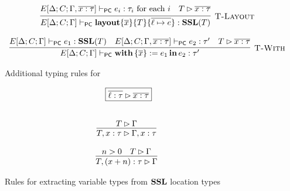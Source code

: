 \begin{figure}
  \[
    \begin{array}{c}
      \labinfer[T-Layout]{E[\Delta;C;\Gamma] \vdashpc \sslmath{\overline{x}}{T}{\overline{\ell \mapsto e}} : \SSL(T)}
        {\begin{gathered}
          E[\Delta;C;\Gamma, \overline{x : \tau}] \vdashpc e_i : \tau_i \textrm{ for each $i$}
          ~~~T \rhd \overline{x : \tau}
         \end{gathered}
        }
      \\\\
      \labinfer[T-With]{E[\Delta;C;\Gamma] \vdashpc \withIn{\{ \overline{x} \} := e_1} e_2 : \tau'}
        {E[\Delta;C;\Gamma] \vdashpc e_1 : \SSL(T)
        &E[\Delta;C;\Gamma,\overline{x : \tau}] \vdashpc e_2 : \tau'
        &T \rhd \overline{x : \tau}
        }
    \end{array}
  \]
  \caption{Additional typing rules for \PikaCore}
  \label{fig:pikacore-typing-judgment}
\end{figure}

\begin{figure}
  \[
    \begin{array}{c}
      \fbox{$\overline{\ell : \tau} \rhd \overline{x : \tau}$}
      \fboxNewlines
      \labinfer{T, x : \tau \rhd \Gamma, x : \tau}
        {T \rhd \Gamma}
      \\\\
      \labinfer{T, (x+n) : \tau \rhd \Gamma}
        {n > 0
        &T \rhd \Gamma
        }
    \end{array}
  \]
  \caption{Rules for extracting variable types from $\textbf{SSL}$ location types}
  \label{fig:SSL-var-typing-judgment}
\end{figure}

